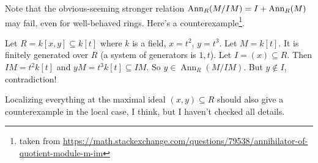 \documentclass[a4paper,parskip=half,numbers=enddot, DIV=12]{scrreprt}
\begin{document}
\begin{rem*}
	Note that the obvious-seeming stronger relation $\operatorname{Ann}_R(M/IM)=I+\operatorname{Ann}_R(M)$ may fail, even for well-behaved rings. Here's a counterexample\footnote{taken from \url{https://math.stackexchange.com/questions/79538/annihilator-of-quotient-module-m-im}}.
	
	 Let $R=k[x,y]\subseteq k[t]$ where $k$ is a field, $x=t^2$, $y=t^3$. Let $M=k[t]$. It is finitely generated over $R$ (a system of generators is $1, t$). 
	Let $I=(x)\subseteq R$. Then $IM=t^2k[t]$ and $yM=t^3k[t]\subseteq IM$. So $y\in \operatorname{Ann}_R(M/IM)$. But $y\notin I$, contradiction! 
	
	Localizing everything at the maximal ideal $(x,y)\subseteq R$ should also give a counterexample in the local case, I think, but I haven't checked all details.
\end{rem*}
\end{document}
